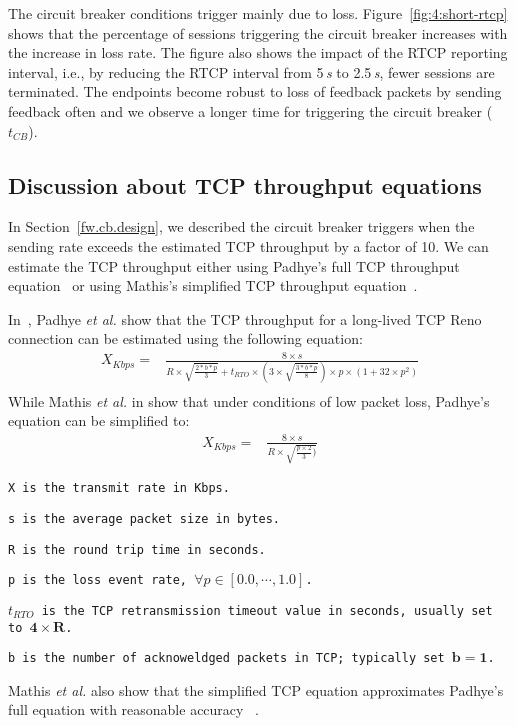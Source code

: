 The circuit breaker conditions trigger mainly due to loss. Figure~\ref{fig:4:short-rtcp} 
shows that the percentage of sessions triggering the circuit breaker
increases with the increase in loss rate. The figure also shows the impact of
the RTCP reporting interval, i.e., by reducing the RTCP interval from 5\,\emph{s} to
2.5\,\emph{s}, fewer sessions are terminated. The endpoints become robust to loss of
feedback packets by sending feedback often and we observe a longer time for
triggering the circuit breaker ($t_{CB}$).

\subsection{Discussion about TCP throughput equations}

In Section~\ref{fw.cb.design}, we described the circuit breaker triggers when
the sending rate exceeds the estimated TCP throughput by a factor of 10. We
can estimate the TCP throughput either using Padhye's full TCP throughput
equation~\cite{padhye1998modeling} or using Mathis's simplified TCP throughput
equation~\cite{mathis1997macroscopic}.

In~\cite{padhye1998modeling}, Padhye \emph{et al.} show that the TCP
throughput for a long-lived TCP Reno connection can be estimated using the
following equation:
\begin{align*}
X_{Kbps} = &\frac{8 \times s}{R \times \sqrt{\frac{2*b*p}{3}}+t_{RTO} \times (3 \times \sqrt{\frac{3*b*p}{8}})\times p \times (1+32 \times p^2)}\\
\end{align*}
While Mathis \emph{et al.} in \cite{mathis1997macroscopic} show that under
conditions of low packet loss, Padhye's equation can be simplified to:
\begin{align*}
    X_{Kbps} = & \frac{8 \times s}{R \times \sqrt{\frac{p \times 2}{3})}}
\end{align*}
\begin{itemize}
\setlength{\itemsep}{0pt}
{\footnotesize
\item[] \texttt{X is the transmit rate in Kbps.}
\item[] \texttt{s is the average packet size in bytes.} 
\item[] \texttt{R is the round trip time in seconds. }
\item[] \texttt{p is the loss event rate, $\forall p \in [0.0, \cdots ,1.0]$.}
\item[] \texttt{$t_{RTO}$ is the TCP retransmission timeout value in seconds, usually set to $\mathbf{4 \times R}$.}
\item[] \texttt{b is the number of acknoweldged packets in TCP; typically set $\mathbf{b=1}$.}
}
\end{itemize}
Mathis \emph{et al.} also show that the simplified TCP equation approximates
Padhye's full equation with reasonable accuracy~\cite{mathis1997macroscopic} .


